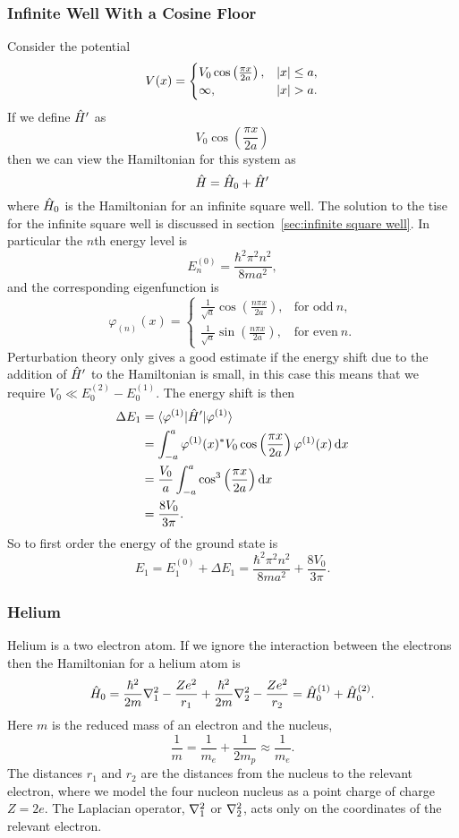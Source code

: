 \subsubsection{Infinite Well With a Cosine Floor}
Consider the potential
\[
V(x) = 
\begin{cases}
    V_0\cos\left(\frac{\pi x}{2a}\right), & \abs{x} \le a,\\
    \infty, & \abs{x} > a.
\end{cases}
\]
If we define \(\hat{H}'\) as
\[V_0 \cos\left(\frac{\pi x}{2a}\right)\]
then we can view the Hamiltonian for this system as
\[\hat{H} = \hat{H}_0 + \hat{H}'\]
where \(\hat{H}_0\) is the Hamiltonian for an infinite square well.
The solution to the \gls{tise} for the infinite square well is discussed in section~\ref{sec:infinite square well}.
In particular the \(n\)th energy level is
\[E_n^{(0)} = \frac{\hbar^2\pi^2 n^2}{8ma^2},\]
and the corresponding eigenfunction is
\[
\varphi_{(n)}(x) =
\begin{cases}
    \frac{1}{\sqrt{a}}\cos\left(\frac{n\pi x}{2a}\right), & \text{for odd}~n,\\
    \frac{1}{\sqrt{a}}\sin\left(\frac{n\pi x}{2a}\right), & \text{for even}~n.
\end{cases}
\]
Perturbation theory only gives a good estimate if the energy shift due to the addition of \(\hat{H}'\) to the Hamiltonian is small, in this case this means that we require \(V_0 \ll E_0^{(2)} - E_0^{(1)}\).
The energy shift is then
\begin{align*}
    \Delta E_1 &= \langle {\varphi^{(1)}} \vert\hat{H}'\vert {\varphi^{(1)}} \rangle\\
    &= \int_{-a}^{a} \varphi^{(1)}(x)^*V_0\cos\left(\frac{\pi x}{2a}\right)\varphi^{(1)} (x)\dd{x}\\
    &= \frac{V_0}{a} \int_{-a}^{a} \cos^3\left(\frac{\pi x}{2a}\right) \dd{x}\\
    &= \frac{8V_0}{3\pi}.
\end{align*}
So to first order the energy of the ground state is
\[E_1 = E_1^{(0)} + \Delta E_1 = \frac{\hbar^2\pi^2 n^2}{8ma^2} + \frac{8V_0}{3\pi}.\]

\subsubsection{Helium}
Helium is a two electron atom.
If we ignore the interaction between the electrons then the Hamiltonian for a helium atom is
\[\hat{H}_0 = \frac{\hbar^2}{2m}\nabla^2_1 - \frac{Ze^2}{r_1} + \frac{\hbar^2}{2m}\nabla^2_2 - \frac{Ze^2}{r_2} = \hat{H}_0^{(1)} + \hat{H}_0^{(2)}.\]
Here \(m\) is the reduced mass of an electron and the nucleus,
\[\frac{1}{m} = \frac{1}{m_e} + \frac{1}{2m_p} \approx \frac{1}{m_e}.\]
The distances \(r_1\) and \(r_2\) are the distances from the nucleus to the relevant electron, where we model the four nucleon nucleus as a point charge of charge \(Z = 2e\).
The Laplacian operator, \(\nabla^2_1\) or \(\nabla^2_2\), acts only on the coordinates of the relevant electron.

